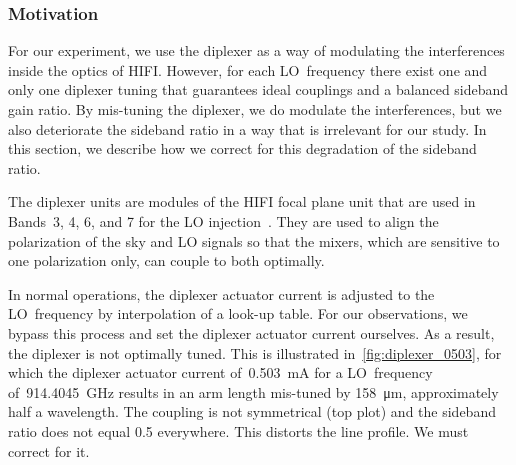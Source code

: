 \subsubsection{Motivation}
For our experiment, we use the diplexer as a way of modulating the interferences inside the optics of HIFI.
However, for each LO~frequency there exist one and only one diplexer tuning that guarantees ideal couplings and a balanced sideband gain ratio.
By mis-tuning the diplexer, we do modulate the interferences, but we also deteriorate the sideband ratio in a way that is irrelevant for our study.
In this section, we describe how we correct for this degradation of the sideband ratio.

The diplexer units are modules of the HIFI focal plane unit that are used in Bands~3, 4, 6, and 7 for the LO injection~\parencite{jackson2002hifi}.
They are used to align the polarization of the sky and LO signals so that the mixers, which are sensitive to one polarization only, can couple to both optimally.




In normal operations, the diplexer actuator current is adjusted to the LO~frequency by interpolation of a look-up table.
For our observations, we bypass this process and set the diplexer actuator current ourselves.
As a result, the diplexer is not optimally tuned.
This is illustrated in~\cref{fig:diplexer_0503}, for which the diplexer actuator current of~\SI{0.503}{\milli\ampere} for a LO~frequency of~\SI{914.4045}{\giga\hertz} results in an arm length mis-tuned by \SI{158}{\micro\meter}, approximately half a wavelength.
The coupling is not symmetrical (top plot) and the sideband ratio does not equal \num{0.5} everywhere.
This distorts the line profile.
We must correct for it.

